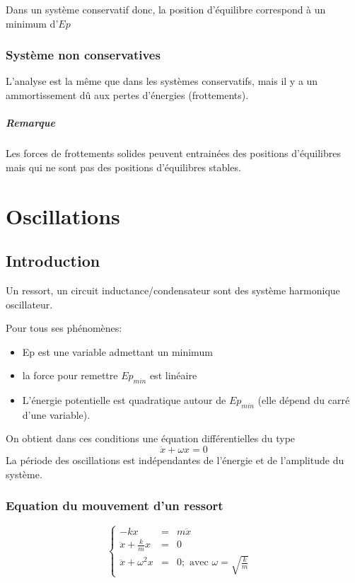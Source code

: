 Dans un système conservatif donc, la position d'équilibre correspond à un minimum d'$Ep$
\subsection{Système non conservatives}
	L'analyse est la même que dans les systèmes conservatifs, mais il y a un ammortissement dû aux pertes d'énergies (frottements).

	\paragraph{Remarque} Les forces de frottements solides peuvent entrainées des positions d'équilibres mais qui ne sont pas des positions d'équilibres stables.

\chapter{Oscillations}

\section{Introduction} Un ressort, un circuit inductance/condensateur sont des système harmonique oscillateur.

Pour tous ses phénomènes:
\begin{itemize}
	\item Ep est une variable admettant un minimum
	\item la force pour remettre $Ep_{min}$ est linéaire
	\item L'énergie potentielle est quadratique autour de $Ep_{min}$ (elle dépend du carré d'une variable).
\end{itemize}

On obtient dans ces conditions une équation différentielles du type \[\ddot{x} + \omega x = 0\]
La période des oscillations est indépendantes de l'énergie et de l'amplitude du système.

\subsection{Equation du mouvement d'un ressort}
\[\left\{\begin{array}{rcll}
			-kx &=& m\ddot{x}& \\
			\ddot{x} + \frac{k}{m}x &=& 0 \\
			\ddot{x} + \omega^2 x &=& 0 ;\text{ avec } \omega = \sqrt{\frac{k}{m}}
	\end{array}\right.\]


